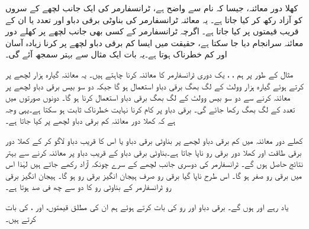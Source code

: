 کھلا  دور معائنہ، جیسا کہ نام سے واضح  ہے،  ٹرانسفارمر کی ایک جانب لچھے کے سروں کو آزاد رکھ کر کیا جاتا ہے۔ یہ معائنہ ٹرانسفارمر کی بناوٹی برقی دباو اور تعدد یا ان کے قریب قیمتوں پر کیا جاتا ہے۔ اگرچہ ٹرانسفارمر کے کسی بھی جانب  لچھے پر کھلے دور معائنہ  سرانجام دیا جا سکتا ہے، حقیقت میں ایسا کم برقی دباو لچھے پر کرنا زیادہ آسان اور کم خطرناک  ہوتا ہے۔یہ بات ایک مثال سے بہتر  سمجھ آئے گی۔

مثال کے طور پر  ہم  ، ،  یک دوری  ٹرانسفارمر کا معائنہ کرنا چاہتے ہیں۔ یہ معائنہ گیارہ ہزار لچھے پر  کرتے ہوئے  گیارہ ہزار وولٹ  کے لگ بھگ برقی دباو استعمال ہو گا جبکہ دو سو بیس برقی دباو  لچھے پر معائنہ کرنے سے دو سو بیس وولٹ کے لگ بھگ برقی دباو  استعمال کرنا ہو  گا۔ دونوں صورتوں میں تعدد  کے لگ بھگ رکھا جائے گی۔ برقی دباو پر کام کرنا نہایت خطرناک ثابت ہو سکتا ہے۔یہی وجہ ہے کہ کھلا دور  معائنہ کم برقی دباو لچھے پر کیا جاتا ہے۔

کھلے دور  معائنہ میں کم برقی دباو لچھے پر بناوٹی برقی دباو یا اس کا قریب  دباو  لاگو کر کے کھلا دور برقی طاقت  اور  کھلا دور برقی رو   ناپا جاتا ہے۔بناوٹی  برقی دباو کے  قریب  دباو پر معائنہ کرنے سے  بہتر نتائج حاصل ہوں گے۔ ٹرانسفارمر کی دوسری جانب لچھے کے سرے چونکہ آزاد رکھے جاتے ہیں لہٰذا اس میں  برقی رو صفر ہو گا۔  اس طرح  ناپا گیا برقی رو صرف ہیجان انگیز برقی رو  ہو گا۔  ہیجان انگیز برقی رو ٹرانسفارمر کے بناوٹی رو کا  دو سے چھ  فی صد ہوتا ہے۔

یاد رہے  اور  ہوں گے۔ برقی دباو اور رو کی بات کرتے ہوئے ہم ان کی مطلق قیمتوں،  اور ، کی بات کرتے ہیں۔ 

